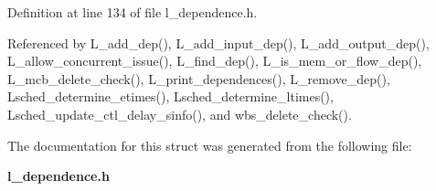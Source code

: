 Definition at line 134 of file l\_\-dependence.h.

Referenced by L\_\-add\_\-dep(), L\_\-add\_\-input\_\-dep(), L\_\-add\_\-output\_\-dep(), L\_\-allow\_\-concurrent\_\-issue(), L\_\-find\_\-dep(), L\_\-is\_\-mem\_\-or\_\-flow\_\-dep(), L\_\-mcb\_\-delete\_\-check(), L\_\-print\_\-dependences(), L\_\-remove\_\-dep(), Lsched\_\-determine\_\-etimes(), Lsched\_\-determine\_\-ltimes(), Lsched\_\-update\_\-ctl\_\-delay\_\-sinfo(), and wbs\_\-delete\_\-check().

The documentation for this struct was generated from the following file:\begin{CompactItemize}
\item 
\bf{l\_\-dependence.h}\end{CompactItemize}
